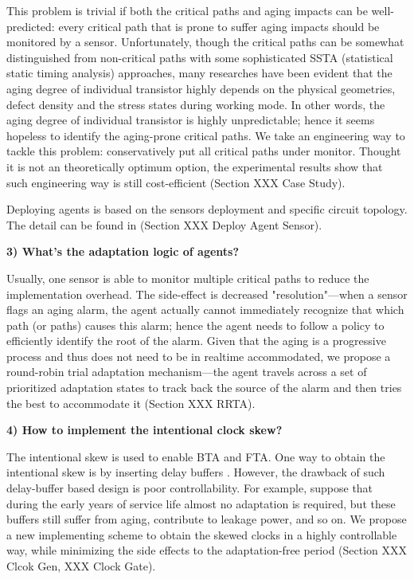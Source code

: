 This problem is trivial if both the critical paths and aging impacts can be well-predicted: every critical path that is prone to suffer aging impacts should be monitored by a sensor. Unfortunately, though the critical paths can be somewhat distinguished from non-critical paths with some sophisticated SSTA (statistical static timing analysis) approaches, many researches have been evident that the aging degree of individual transistor highly depends on the physical geometries, defect density and the stress states during working mode. In other words, the aging degree of individual transistor is highly unpredictable; hence it seems hopeless to identify the aging-prone critical paths. We take an engineering way to tackle this problem: conservatively put all critical paths under monitor. Thought it is not an theoretically optimum option, the experimental results show that such engineering way is still cost-efficient (Section XXX Case Study).

Deploying agents is based on the sensors deployment and specific circuit topology. The detail can be found in (Section XXX Deploy Agent Sensor).

{\bf 3) What's the adaptation logic of agents?}

Usually, one sensor is able to monitor multiple critical paths to reduce the implementation overhead. The side-effect is decreased "resolution"---when a sensor flags an aging alarm, the agent actually cannot immediately recognize that which path (or paths) causes this alarm; hence the agent needs to follow a policy to efficiently identify the root of the alarm. Given that the aging is a progressive process and thus does not need to be in realtime accommodated, we propose a round-robin trial adaptation mechanism---the agent travels across a set of prioritized adaptation states to track back the source of the alarm and then tries the best to accommodate it (Section XXX RRTA).


{\bf 4) How to implement the intentional clock skew?}

The intentional skew is used to enable BTA and FTA.  One way to obtain the intentional skew is by inserting delay buffers \cite{Recycle_07}. However, the drawback of such delay-buffer based design is poor controllability. For example, suppose that during the early years of service life almost no adaptation is required, but these buffers still suffer from aging, contribute to leakage power, and so on. We propose a new implementing scheme to obtain the skewed clocks in a highly controllable way, while minimizing the side effects to the adaptation-free period (Section XXX Clcok Gen, XXX Clock Gate).


